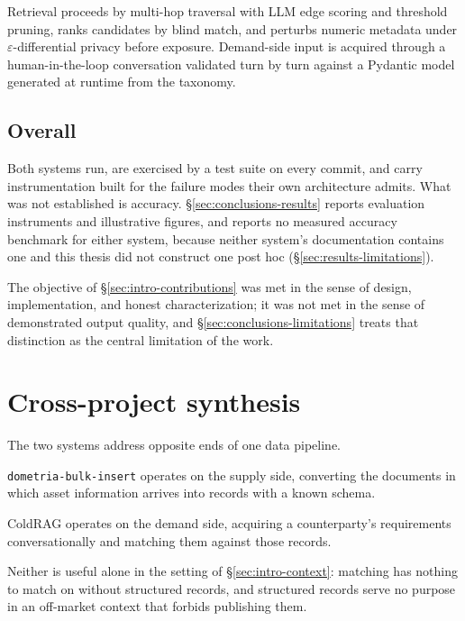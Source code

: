 Retrieval proceeds by multi-hop traversal with LLM edge scoring and threshold pruning, ranks candidates by blind match, and perturbs numeric metadata under $\varepsilon$-differential privacy before exposure. Demand-side input is acquired through a human-in-the-loop conversation validated turn by turn against a Pydantic model generated at runtime from the taxonomy.

\subsection{Overall}

Both systems run, are exercised by a test suite on every commit, and carry instrumentation built for the failure modes their own architecture admits. What was not established is accuracy. \S\ref{sec:conclusions-results} reports evaluation instruments and illustrative figures, and reports no measured accuracy benchmark for either system, because neither system's documentation contains one and this thesis did not construct one post hoc (\S\ref{sec:results-limitations}). 


The objective of \S\ref{sec:intro-contributions} was met in the sense of design, implementation, and honest characterization; it was not met in the sense of demonstrated output quality, and \S\ref{sec:conclusions-limitations} treats that distinction as the central limitation of the work.

\section{Cross-project synthesis}
\label{sec:conclusions-synthesis}

The two systems address opposite ends of one data pipeline. 


\texttt{dometria-bulk-insert} operates on the supply side, converting the documents in which asset information arrives into records with a known schema. 


ColdRAG operates on the demand side, acquiring a counterparty's requirements conversationally and matching them against those records. 


Neither is useful alone in the setting of \S\ref{sec:intro-context}: matching has nothing to match on without structured records, and structured records serve no purpose in an off-market context that forbids publishing them.


